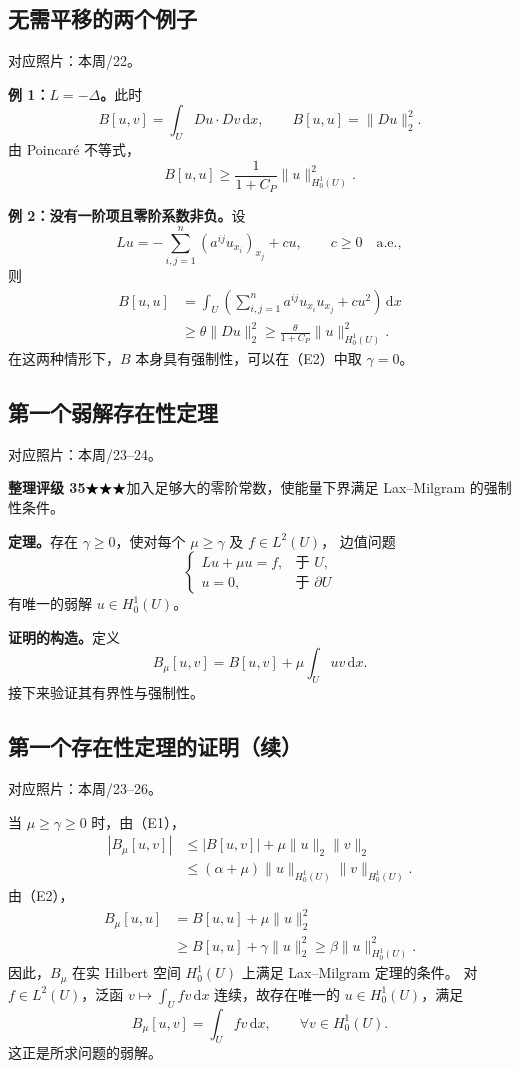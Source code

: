 \documentclass[UTF8,a4paper,11pt,fontset=fandol]{ctexart}
\newcommand{\dd}{\,\mathrm d}
\newcommand{\source}[1]{{\small\color{notegray}对应照片：#1。}\par}
\newcommand{\proofstars}[1]{\ensuremath{%
\ifnum#1>0\relax\bigstar\fi
\ifnum#1>1\relax\bigstar\fi
\ifnum#1>2\relax\bigstar\fi
\ifnum#1>3\relax\bigstar\fi
\ifnum#1>4\relax\bigstar\fi}}
\newcommand{\proofrating}[3]{\par{\small\color{proofblue}%
\textbf{整理评级 #1}\enspace\proofstars{#2}\quad #3\par}}
\begin{document}
\newpage
\subsection{无需平移的两个例子}
\source{本周/22}
\textbf{例 1：$L=-\Delta$。}此时
\[
B[u,v]=\int_UDu\cdot Dv\dd x,\qquad
B[u,u]=\|Du\|_2^2.
\]
由 Poincaré 不等式，
\[
B[u,u]\geq\frac{1}{1+C_P}\|u\|_{H_0^1(U)}^2.
\]

\textbf{例 2：没有一阶项且零阶系数非负。}设
\[
Lu=-\sum_{i,j=1}^n(a^{ij}u_{x_i})_{x_j}+cu,\qquad c\geq0\quad\text{a.e.},
\]
则
\[
\begin{aligned}
B[u,u]
&=\int_U\left(\sum_{i,j=1}^na^{ij}u_{x_i}u_{x_j}+cu^2\right)\dd x\\
&\geq\theta\|Du\|_2^2
\geq\frac{\theta}{1+C_P}\|u\|_{H_0^1(U)}^2.
\end{aligned}
\]
在这两种情形下，$B$ 本身具有强制性，可以在（E2）中取 $\gamma=0$。

\subsection{第一个弱解存在性定理}
\source{本周/23--24}
\proofrating{35}{3}{加入足够大的零阶常数，使能量下界满足 Lax--Milgram 的强制性条件。}
\textbf{定理。}存在 $\gamma\geq0$，使对每个 $\mu\geq\gamma$ 及 $f\in L^2(U)$，
边值问题
\[
\boxed{\begin{cases}
Lu+\mu u=f,&\text{于 }U,\\
u=0,&\text{于 }\partial U
\end{cases}}
\]
有唯一的弱解 $u\in H_0^1(U)$。

\textbf{证明的构造。}定义
\[
B_\mu[u,v]=B[u,v]+\mu\int_Uuv\dd x.
\]
接下来验证其有界性与强制性。

\newpage
\subsection*{第一个存在性定理的证明（续）}
\source{本周/23--26}
当 $\mu\geq\gamma\geq0$ 时，由（E1），
\[
\begin{aligned}
|B_\mu[u,v]|
&\leq|B[u,v]|+\mu\|u\|_2\|v\|_2\\
&\leq(\alpha+\mu)\|u\|_{H_0^1(U)}\|v\|_{H_0^1(U)}.
\end{aligned}
\]
由（E2），
\[
\begin{aligned}
B_\mu[u,u]
&=B[u,u]+\mu\|u\|_2^2\\
&\geq B[u,u]+\gamma\|u\|_2^2
\geq\beta\|u\|_{H_0^1(U)}^2.
\end{aligned}
\]
因此，$B_\mu$ 在实 Hilbert 空间 $H_0^1(U)$ 上满足 Lax--Milgram 定理的条件。
对 $f\in L^2(U)$，泛函 $v\mapsto\int_Ufv\dd x$ 连续，故存在唯一的
$u\in H_0^1(U)$，满足
\[
B_\mu[u,v]=\int_Ufv\dd x,\qquad\forall v\in H_0^1(U).
\]
这正是所求问题的弱解。
\end{document}
